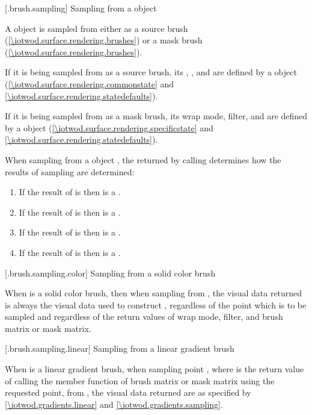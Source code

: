  [\iotwod.brush.sampling] {Sampling from a  object}

\pnum
A  object is sampled from either as a source brush (\ref{\iotwod.surface.rendering.brushes}) or a mask brush (\ref{\iotwod.surface.rendering.brushes}).

\pnum
If it is being sampled from as a source brush, its , , and  are defined by a  object (\ref{\iotwod.surface.rendering.commonstate} and \ref{\iotwod.surface.rendering.statedefaults}).

\pnum
If it is being sampled from as a mask brush, its wrap mode, filter, and  are defined by a  object (\ref{\iotwod.surface.rendering.specificstate} and \ref{\iotwod.surface.rendering.statedefaults}).

\pnum
When sampling from a  object , the  returned by calling  determines how the results of sampling are determined:
\begin{enumerate}
\item If the result of  is  then  is a .
\item If the result of  is  then  is a .
\item If the result of  is  then  is a .
\item If the result of  is  then  is a .
\end{enumerate}

 [\iotwod.brush.sampling.color] {Sampling from a solid color brush}

\pnum
When  is a solid color brush, then when sampling from , the visual data returned is always the visual data used to construct , regardless of the point which is to be sampled and regardless of the return values of wrap mode, filter, and brush matrix or mask matrix.

 [\iotwod.brush.sampling.linear] {Sampling from a linear gradient brush}

\pnum
When  is a linear gradient brush, when sampling point , where  is the return value of calling the  member function of brush matrix or mask matrix using the requested point, from , the visual data returned are as specified by \ref{\iotwod.gradients.linear} and \ref{\iotwod.gradients.sampling}.

